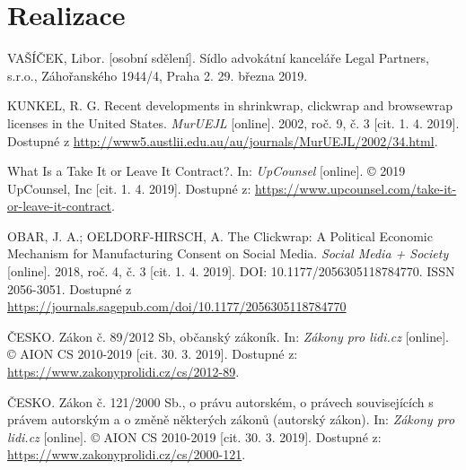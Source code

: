 \documentclass[thesis=B,czech]{FITthesis}[2012/06/26]
\begin{document}


\chapter{Realizace}




\begin{conclusion}
\end{conclusion}




\begin{thebibliography}{99}
	VAŠÍČEK, Libor. [osobní sdělení]. Sídlo advokátní kanceláře Legal Partners, s.r.o., Záhořanského 1944/4, Praha 2. 29. března 2019.
	
	KUNKEL, R. G. Recent developments in shrinkwrap, clickwrap and browsewrap licenses in the United States. \textit{MurUEJL} [online]. 2002, roč. 9, č. 3 [cit. 1. 4. 2019]. Dostupné z \url{http://www5.austlii.edu.au/au/journals/MurUEJL/2002/34.html}.
	
	What Is a Take It or Leave It Contract?. In: \textit{UpCounsel} [online]. © 2019 UpCounsel, Inc [cit. 1. 4. 2019]. Dostupné z: \url{https://www.upcounsel.com/take-it-or-leave-it-contract}.
	
	OBAR, J. A.; OELDORF-HIRSCH, A. The Clickwrap: A Political Economic Mechanism for Manufacturing Consent on Social Media. \textit{Social Media + Society} [online]. 2018, roč. 4, č. 3 [cit. 1. 4. 2019]. DOI: 10.1177/2056305118784770. ISSN 2056-3051. Dostupné z \url{https://journals.sagepub.com/doi/10.1177/2056305118784770}
	
	ČESKO. Zákon č. 89/2012 Sb, občanský zákoník. In: \textit{Zákony pro lidi.cz} [online]. © AION CS 2010-2019 [cit. 30. 3. 2019]. Dostupné z: \url{https://www.zakonyprolidi.cz/cs/2012-89}.
	
	ČESKO. Zákon č. 121/2000 Sb., o právu autorském, o právech souvisejících s právem autorským a o změně některých zákonů (autorský zákon). In: \textit{Zákony pro lidi.cz} [online]. © AION CS 2010-2019 [cit. 30. 3. 2019]. Dostupné z: \url{https://www.zakonyprolidi.cz/cs/2000-121}.
	

\end{thebibliography}
\end{document}
